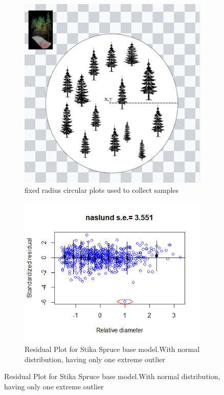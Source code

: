 \documentclass[a4paper,11pt,twoside]{report}
\begin{document}
\begin{figure}[h]
    \centering
    \caption[Plot and qqplot]{Example of sample plot, and a QQplot}
    \begin{subfigure}{.5\textwidth}
      \centering
      \includegraphics[width=.8\linewidth]{Images/Captureplotsize.PNG}
      \caption{fixed radius circular plots used to collect samples}
      \label{fig:fixed radius circular plots used to collect samples}
    \end{subfigure}
    \begin{subfigure}{.5\textwidth}
     \includegraphics[width=1.2\linewidth]{Images/SS_Residualsplot.png}
    \caption{Residual Plot for Stika Spruce base model.With normal distribution, having only one extreme outlier}
    \label{fig:my_label} 
    \end{subfigure}
    
\end{figure}
\end{document}
